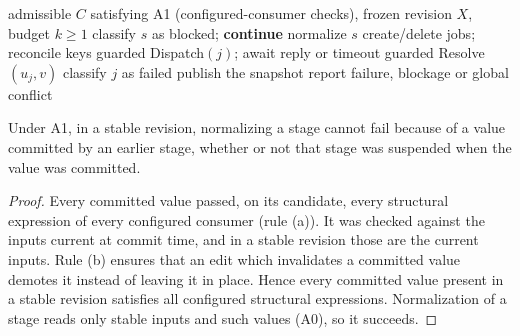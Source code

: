 \begin{algorithm}[!t]
\caption{Topological repair of a stable revision}\label{alg:schedule}
\footnotesize
\begin{algorithmic}[1]
\Require admissible $C$ satisfying A1 (configured-consumer checks), frozen revision $X$, budget $k\ge1$
    \State classify $s$ as blocked; \textbf{continue}
  \EndIf
  \State normalize $s$ 
  \State create/delete jobs; reconcile keys 
      \State guarded Dispatch$(j)$; await reply or timeout
      \State guarded Resolve$(u_j,v)$
    \EndWhile
     classify $j$ as failed \EndIf
  \EndFor
\EndFor
{}
  \State publish the snapshot
\Else
  \State report failure, blockage or global conflict
\EndIf
\end{algorithmic}
\end{algorithm}

\begin{lemma}\label{lem:reactivation}
Under A1, in a stable revision, normalizing a stage cannot fail because of a value committed by an earlier stage, whether or not that stage was suspended when the value was committed.
\end{lemma}
\begin{proof}
Every committed value passed, on its candidate, every structural expression of every configured consumer (rule (a)). It was checked against the inputs current at commit time, and in a stable revision those are the current inputs. Rule (b) ensures that an edit which invalidates a committed value demotes it instead of leaving it in place. Hence every committed value present in a stable revision satisfies all configured structural expressions. Normalization of a stage reads only stable inputs and such values (A0), so it succeeds.
\end{proof}

